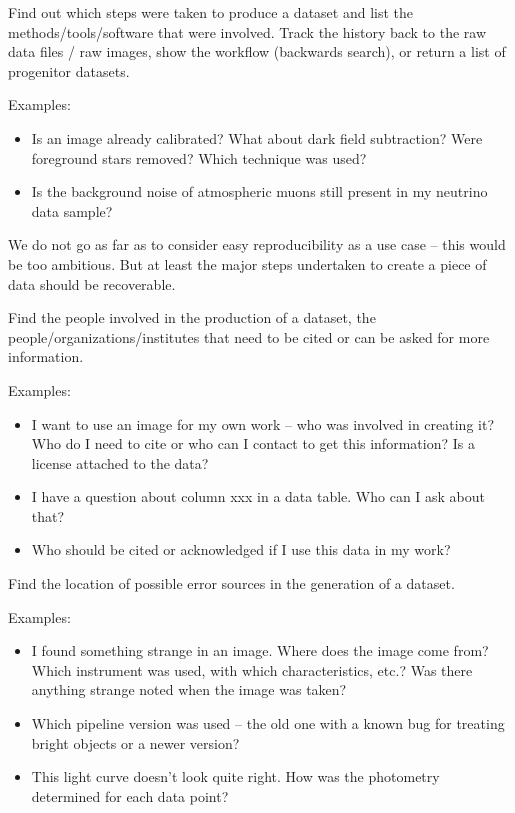         Find out which steps were taken to produce a dataset and list the
        methods\slash{}tools\slash{}software that were involved. Track the
        history back to the raw data files \slash{} raw images, show the
        workflow (backwards search), or return a list of progenitor datasets.

        \noindent Examples: 
        \begin{itemize}
            \item Is an image already calibrated?
What about dark field subtraction? Were foreground stars removed? Which technique
was used?  
            \item Is the background noise of atmospheric muons still present in my neutrino data sample?  
        \end{itemize}

        We do not go as far as to consider easy reproducibility as a use case -- this would be too ambitious. But at least the 
        major steps undertaken to create a piece of data should be recoverable.


        Find the people involved in the production of a dataset,
        the people\slash{}organizations\slash{}institutes that need to be cited
        or can be asked for more information.

        \noindent Examples: 
        \begin{itemize}
            \item I want to use an image for my own work -- who was involved in
creating it? Who do I need to cite or who can I contact to get this information? Is a license attached to the data? 
            \item I have a question about column xxx in a data
table. Who can I ask about that?  
            \item Who should be cited or acknowledged if I use this data in my work?
        \end{itemize}


        Find the location of possible error sources in the generation of a dataset.

        \noindent Examples:
        \begin{itemize}
            \item I found something strange in an image. Where does
the image come from? Which instrument was used, with which characteristics,
etc.? Was there anything strange noted when the image was taken?  
            \item Which pipeline version was used -- the old one
with a known bug for treating bright objects or a newer version?  
            \item This light curve doesn't look quite right. How was
the photometry determined for each data point?  
        \end{itemize}


